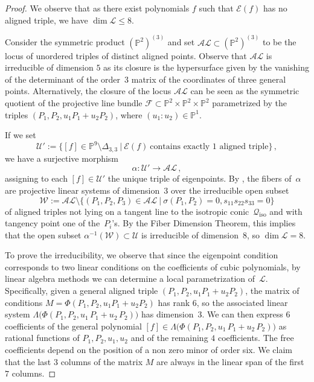 \documentclass[a4paper, 11pt, reqno]{amsart}
\theoremstyle{plain}
\theoremstyle{definition}
\newcommand{\p}{\mathbb{P}}
\newcommand{\sL}{\mathcal{L}}
\newcommand{\sU}{\mathcal{U}}
\newcommand{\sF}{\mathcal{F}}
\newcommand{\iso}{\mathcal{Q}_{\mathrm{iso}}}
\newcommand{\Eig}[1]{\mathcal{E}\!\left( {#1} \right)}
\begin{document}
\begin{proof}
We observe that as there exist
polynomials $f$ such that $\Eig{f}$ has no aligned triple, we have $\dim \sL \le 8$.

Consider the symmetric product $(\p^2)^{(3)}$ and set $\mathcal{AL} \subset (\p^2)^{(3)}$ to be the locus of unordered triples of distinct aligned points. Observe that $\mathcal{AL}$ is irreducible of dimension $5$ as its closure is the hypersurface given by the vanishing of the determinant of the order~$3$ matrix of the coordinates of three general points. Alternatively, the closure of the locus $\mathcal {AL}$ can be seen as the symmetric quotient of the projective line bundle $\sF \subset \p^2 \times \p^2 \times \p^2$ parametrized by the triples $(P_1, P_2, u_1 P_1 +u_2P_2)$, where $(u_1:u_2) \in \p^1$.

If we set
%
\[
  \sU':= \{[f]\in \p^9 \setminus \Delta_{3,3} \ | \ \Eig{f} \ \text{contains exactly $1$ aligned triple}\} \,,
\]
%
we have a surjective morphism
%
\[
  \alpha \colon \mathcal{U}' \to \mathcal{AL} \,,
\]
%
assigning to each $[f] \in \mathcal{U}'$ the unique triple of eigenpoints.
By , the fibers of~$\alpha$ are projective linear systems of dimension~$3$ over the irreducible open subset
%
\[
  \mathcal{W} := \mathcal{AL}
  \setminus \{(P_1,P_2,P_3) \in \mathcal{AL}
  \ | \ \sigma(P_1,P_2)=0, s_{11} s_{22} s_{33}=0\}
\]
%
of aligned triples not lying
on a tangent line to the isotropic conic~$\iso$ and with tangency point one of the~$P_i$'s. 
By the Fiber Dimension Theorem, this implies that the open subset $\alpha^{-1} (\mathcal{W}) \subset \sU$ is irreducible of dimension~$8$, so $\dim \sL =8$.

To prove the irreducibility, we observe that since the eigenpoint condition corresponds to two linear conditions on the coefficients of cubic polynomials, by linear algebra methods we can determine a local parametrization of~$\sL$.
Specifically, given a general aligned triple $(P_1, P_2, u_1 P_1 +u_2P_2)$, the matrix of conditions $M=\Phi(P_1, P_2, u_1 P_1 +u_2P_2)$ has rank $6$, so the associated linear system
$\Lambda \bigl( \Phi(P_1, P_2, u_1 \, P_1 + u_2 \, P_2) \bigr)$ has dimension~$3$. We can then express $6$ coefficients of the general polynomial
$[f]\in \Lambda \bigl( \Phi(P_1, P_2, u_1 \, P_1 + u_2 \, P_2) \bigr)$ as rational functions of $P_1,P_2,u_1,u_2$ and of the remaining $4$ coefficients. The free coefficients depend on the position of a non zero minor of order six.
We claim that the last $3$ columns of the matrix
$M$ are always in the linear span of the first $7$ columns.


\end{proof}
\end{document}
